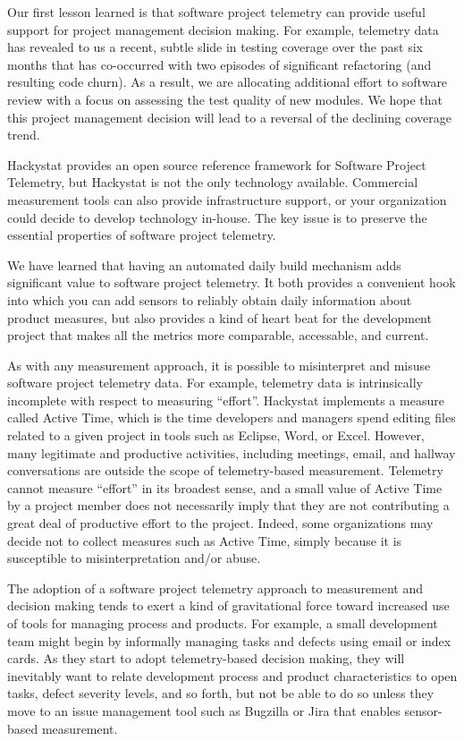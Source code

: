 \documentclass[11pt,twocolumn]{article}
\begin{document}

Our first lesson learned is that software project telemetry can provide
useful support for project management decision making. For example,
telemetry data has revealed to us a recent, subtle slide in testing
coverage over the past six months that has co-occurred with two episodes of
significant refactoring (and resulting code churn).  As a result, we are
allocating additional effort to software review with a focus on assessing
the test quality of new modules.  We hope that this project management
decision will lead to a reversal of the declining coverage trend.

Hackystat provides an open source reference framework for Software Project
Telemetry, but Hackystat is not the only technology available.  Commercial
measurement tools can also provide infrastructure support, or your
organization could decide to develop technology in-house. The key issue is
to preserve the essential properties of software project telemetry.

We have learned that having an automated daily build mechanism adds significant value to
software project telemetry. It both provides a convenient hook into which
you can add sensors to reliably obtain daily information about product
measures, but also provides a kind of heart beat for the development
project that makes all the metrics more comparable, accessable, and
current.

As with any measurement approach, it is possible to misinterpret and misuse
software project telemetry data. For example, telemetry data is
intrinsically incomplete with respect to measuring ``effort''.  Hackystat
implements a measure called Active Time, which is the time developers and
managers spend editing files related to a given project in tools such as
Eclipse, Word, or Excel. However, many legitimate and productive
activities, including meetings, email, and hallway conversations are
outside the scope of telemetry-based measurement. Telemetry cannot measure
``effort'' in its broadest sense, and a small value of Active Time by a
project member does not necessarily imply that they are not contributing a
great deal of productive effort to the project.  Indeed, some organizations
may decide not to collect measures such as Active Time, simply because it
is susceptible to misinterpretation and/or abuse.

The adoption of a software project telemetry approach to measurement and
decision making tends to exert a kind of gravitational force toward
increased use of tools for managing process and products. For example, a
small development team might begin by informally managing tasks and defects
using email or index cards.  As they start to adopt telemetry-based
decision making, they will inevitably want to relate development process
and product characteristics to open tasks, defect severity levels, and so
forth, but not be able to do so unless they move to an issue management
tool such as Bugzilla or Jira that enables sensor-based measurement.
\end{document}

